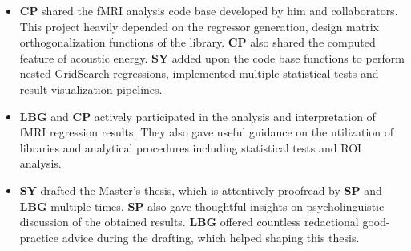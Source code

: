 \begin{declarationcontribution}
\begin{itemize}
    \item \textbf{CP} shared the fMRI analysis code base developed by him and collaborators. This project heavily depended on the regressor generation, design matrix orthogonalization functions of the library. \textbf{CP} also shared the computed feature of acoustic energy. \textbf{SY} added upon the code base functions to perform nested GridSearch regressions, implemented multiple statistical tests and result visualization pipelines.
    \item \textbf{LBG} and \textbf{CP} actively participated in the analysis and interpretation of fMRI regression results. They also gave useful guidance on the utilization of  libraries and analytical procedures including statistical tests and ROI analysis.
    \item \textbf{SY} drafted the Master's thesis, which is attentively proofread by \textbf{SP} and \textbf{LBG} multiple times. \textbf{SP} also gave thoughtful insights on psycholinguistic discussion of the obtained results. \textbf{LBG} offered countless redactional good-practice advice during the drafting, which helped shaping this thesis.
    \end{itemize}
     
\end{declarationcontribution}

\clearpage